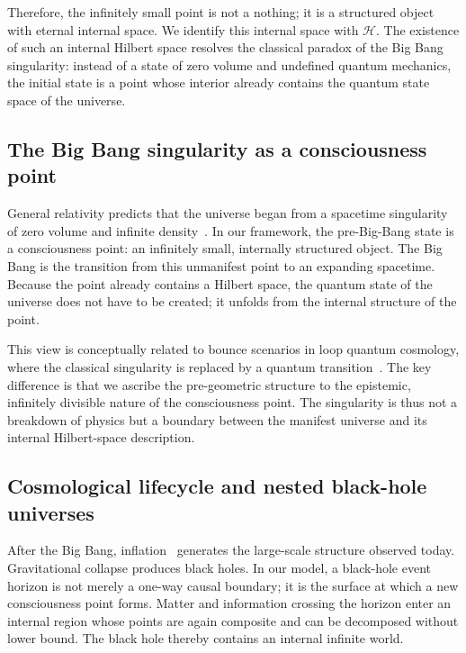 \documentclass[11pt,a4paper]{article}
\theoremstyle{plain}
\begin{document}
Therefore, the infinitely small point is not a nothing; it is a structured object with eternal internal space. We identify this internal space with $\mathcal{H}$. The existence of such an internal Hilbert space resolves the classical paradox of the Big Bang singularity: instead of a state of zero volume and undefined quantum mechanics, the initial state is a point whose interior already contains the quantum state space of the universe.

\subsection{The Big Bang singularity as a consciousness point}

General relativity predicts that the universe began from a spacetime singularity of zero volume and infinite density~\cite{hawkingpenrose1966}. In our framework, the pre-Big-Bang state is a consciousness point: an infinitely small, internally structured object. The Big Bang is the transition from this unmanifest point to an expanding spacetime. Because the point already contains a Hilbert space, the quantum state of the universe does not have to be created; it unfolds from the internal structure of the point.

This view is conceptually related to bounce scenarios in loop quantum cosmology, where the classical singularity is replaced by a quantum transition~\cite{bojowald2008,ashtekarsingh2011}. The key difference is that we ascribe the pre-geometric structure to the epistemic, infinitely divisible nature of the consciousness point. The singularity is thus not a breakdown of physics but a boundary between the manifest universe and its internal Hilbert-space description.

\subsection{Cosmological lifecycle and nested black-hole universes}

After the Big Bang, inflation~\cite{guth1981} generates the large-scale structure observed today. Gravitational collapse produces black holes. In our model, a black-hole event horizon is not merely a one-way causal boundary; it is the surface at which a new consciousness point forms. Matter and information crossing the horizon enter an internal region whose points are again composite and can be decomposed without lower bound. The black hole thereby contains an internal infinite world.
\end{document}
